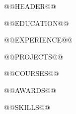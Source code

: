 \documentclass[letterpaper,11pt]{article}
\begin{document}
@@HEADER@@

@@EDUCATION@@

@@EXPERIENCE@@

@@PROJECTS@@

@@COURSES@@

@@AWARDS@@

@@SKILLS@@
\end{document}
